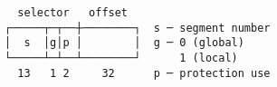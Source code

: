 \documentclass[varwidth,crop]{standalone}
\begin{document}
\begin{verbatim}
  selector   offset
┌─────┬─┬──┼────────┐  s ─ segment number
│  s  │g│p │        │  g ─ 0 (global)
└─────┴─┴──┴────────┘      1 (local)
  13   1 2     32      p ─ protection use
\end{verbatim}
\end{document}
